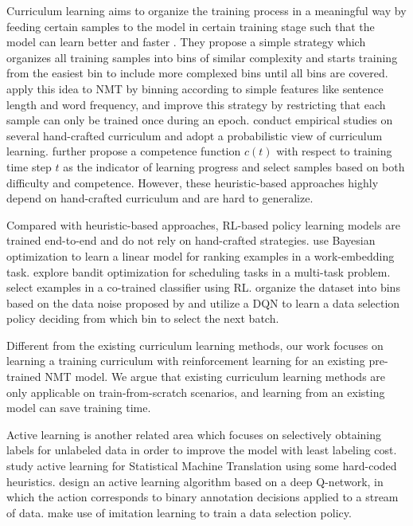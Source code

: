 \documentclass[letterpaper]{article}
\begin{document}
Curriculum learning aims to organize the training process in a meaningful way by feeding certain samples to the model in certain training stage such that the model can learn better and faster \cite{bengio2009curriculum}. They propose a simple strategy which organizes all training samples into bins of similar complexity and starts training from the easiest bin to include more complexed bins until all bins are covered. \cite{kocmi2017curriculum} apply this idea to NMT by binning according to simple features like sentence length and word frequency, and improve this strategy by restricting that each sample can only be trained once during an epoch. \cite{zhang2018empirical} conduct empirical studies on several hand-crafted curriculum and adopt a probabilistic view of curriculum learning. \cite{platanios2019competence} further propose a competence function $c(t)$ with respect to training time step $t$ as the indicator of learning progress and select samples based on both difficulty and competence. However, these heuristic-based approaches highly depend on hand-crafted curriculum and are hard to generalize.

Compared with heuristic-based approaches, RL-based policy learning models are trained end-to-end and do not rely on hand-crafted strategies. \cite{tsvetkov2016learning} use Bayesian optimization to learn a linear model for ranking examples in a work-embedding task. \cite{graves2017automated} explore bandit optimization for scheduling tasks in a multi-task problem.\cite{wu2018reinforced} select examples in a co-trained classifier using RL. \cite{kumar2019reinforcement} organize the dataset into bins based on the data noise proposed by \cite{wang2018denoising} and utilize a DQN to learn a data selection policy deciding from which bin to select the next batch.

Different from the existing curriculum learning methods, our work focuses on learning a training curriculum with reinforcement learning for an existing pre-trained NMT model. We argue that existing curriculum learning methods are only applicable on train-from-scratch scenarios, and learning from an existing model can save training time.

Active learning \cite{settles2009active} is another related area which focuses on selectively obtaining labels for unlabeled data in order to improve the model with least labeling cost. \cite{haffari2009active} \cite{bloodgood2010bucking} study active learning for Statistical Machine Translation using some hard-coded heuristics. \cite{fang2017learning} design an active learning algorithm based on a deep Q-network, in which the action corresponds to binary annotation decisions applied to a stream of data. \cite{liu2018learning} make use of imitation learning to train a data selection policy.
\end{document}

